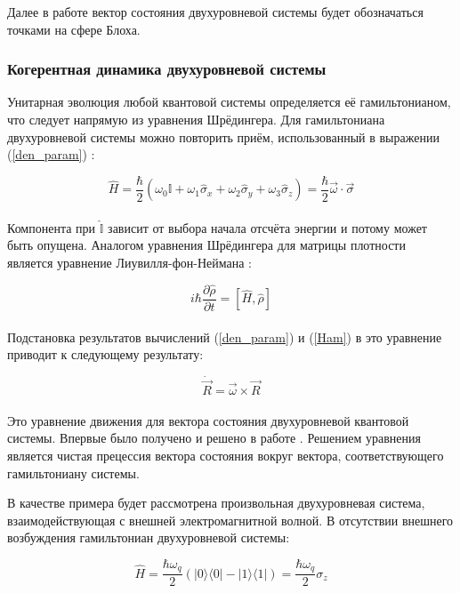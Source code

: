 Далее в работе вектор состояния двухуровневой системы будет обозначаться точками на сфере Блоха.

\subsubsection{Когерентная динамика двухуровневой системы}\label{cohdin}

Унитарная эволюция любой квантовой системы определяется её гамильтонианом, что следует напрямую из уравнения Шрёдингера. Для гамильтониана двухуровневой системы можно повторить приём, использованный в выражении (\ref{den_param}) :

\begin{equation}
\label{Ham}
\tag{8}
\hat H = \frac{\hbar}{2}(\omega_0\hat{\mathbb{I}}+\omega_1\hat\sigma_x+\omega_2\hat\sigma_y+\omega_3\hat\sigma_z) = \frac{\hbar}{2}\vec{\omega}\cdot\vec{\sigma}
\end{equation}
\\

Компонента при $\hat{\mathbb{I}}$ зависит от выбора начала отсчёта энергии и потому может быть опущена. Аналогом уравнения Шрёдингера для матрицы плотности является уравнение Лиувилля-фон-Неймана \cite{Neumann1957}:

\begin{equation}
\tag{9}
\label{liuv}
i\hbar\frac{\partial\hat\rho}{\partial t}=[\hat H, \hat\rho ]
\end{equation}
\\  

Подстановка результатов вычислений (\ref{den_param}) и (\ref{Ham}) в это уравнение приводит к следующему результату:

\begin{equation}
\tag{10}
\dot {\vec R} = \vec \omega \times \vec R
\end{equation}
\\

Это уравнение движения для вектора состояния двухуровневой квантовой системы. Впервые было получено и решено в работе \cite{Feynman1963}. Решением уравнения является чистая прецессия вектора состояния вокруг вектора, соответствующего гамильтониану системы.

В качестве примера будет рассмотрена произвольная двухуровневая система, взаимодействующая с внешней электромагнитной волной. В отсутствии внешнего возбуждения гамильтониан двухуровневой системы:

\begin{equation}
\label{tlsham}
\tag{11}
\hat H = \frac{\hbar\omega_q}{2}(|0\rangle\langle0| - |1\rangle\langle1|) = \frac{\hbar\omega_q}{2}\sigma_z
\end{equation}
\\

